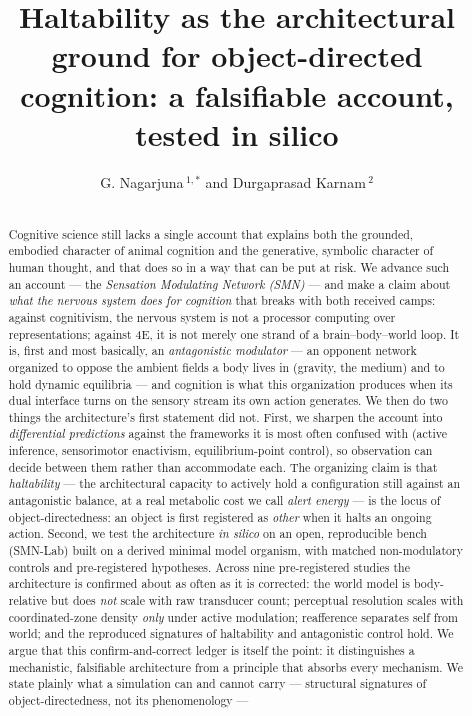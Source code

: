 \documentclass[utf8]{FrontiersinHarvard} %
\def\firstAuthorLast{Nagarjuna {and} Karnam}
\def\Authors{G. Nagarjuna\,$^{1,*}$ and Durgaprasad Karnam\,$^{2}$}
\begin{document}
\onecolumn
{}

\title[Haltability and object-directed cognition]{Haltability as the architectural ground for object-directed cognition: a falsifiable account, tested in silico}

\author[\firstAuthorLast ]{\Authors}
\address{}
\correspondance{}
\extraAuth{}

\maketitle

\begin{abstract}
\section{}
Cognitive science still lacks a single account that explains both the grounded, embodied character of animal cognition and the generative, symbolic character of human thought, and that does so in a way that can be put at risk. We advance such an account --- the \emph{Sensation Modulating Network (SMN)} --- and make a claim about \emph{what the nervous system does for cognition} that breaks with both received camps: against cognitivism, the nervous system is not a processor computing over representations; against 4E, it is not merely one strand of a brain--body--world loop. It is, first and most basically, an \emph{antagonistic modulator} --- an opponent network organized to oppose the ambient fields a body lives in (gravity, the medium) and to hold dynamic equilibria --- and cognition is what this organization produces when its dual interface turns on the sensory stream its own action generates. We then do two things the architecture's first statement did not. First, we sharpen the account into \emph{differential predictions} against the frameworks it is most often confused with (active inference, sensorimotor enactivism, equilibrium-point control), so observation can decide between them rather than accommodate each. The organizing claim is that \emph{haltability} --- the architectural capacity to actively hold a configuration still against an antagonistic balance, at a real metabolic cost we call \emph{alert energy} --- is the locus of object-directedness: an object is first registered as \emph{other} when it halts an ongoing action. Second, we test the architecture \emph{in silico} on an open, reproducible bench (SMN-Lab) built on a derived minimal model organism, with matched non-modulatory controls and pre-registered hypotheses. Across nine pre-registered studies the architecture is confirmed about as often as it is corrected: the world model is body-relative but does \emph{not} scale with raw transducer count; perceptual resolution scales with coordinated-zone density \emph{only} under active modulation; reafference separates self from world; and the reproduced signatures of haltability and antagonistic control hold. We argue that this confirm-and-correct ledger is itself the point: it distinguishes a mechanistic, falsifiable architecture from a principle that absorbs every mechanism. We state plainly what a simulation can and cannot carry --- structural signatures of object-directedness, not its phenomenology --- 
\end{abstract}
\end{document}
